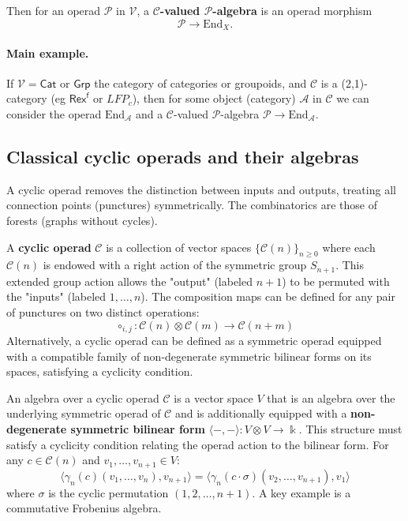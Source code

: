 \documentclass[11pt]{article}
\newcommand{\cat}[1]{\mathcal{#1}}
\newcommand{\field}{\Bbbk}
\newcommand{\C}{\mathcal{C}}
\newcommand{\Rexf}{\mathsf{Rex}^{\mathsf{f}}}
\newcommand{\cA}{\mathcal{A}}
\theoremstyle{definition}
\begin{document}
Then for an operad $\cat{P}$ in $\cat{V}$, a \textbf{$\cat{C}$-valued $\cat{P}$-algebra} is an operad morphism $$\cat{P} \to \text{End}_X.$$


\paragraph{Main example.} If $\cat{V}= \mathsf{Cat}$ or $\mathsf{Grp}$ the category of categories or groupoids, and $\C$ is a (2,1)-category (eg $\Rexf$ or $LFP_c$), then for some object (category) $\cA $ in $\C$ we can consider the operad $\text{End}_\cA$ and a $\C$-valued $\cat{P}$-algebra $\cat{P} \to \text{End}_\cA$.


\subsection{Classical cyclic operads and their algebras}


A cyclic operad removes the distinction between inputs and outputs, treating all connection points (punctures) symmetrically. The combinatorics are those of forests (graphs without cycles).


A \textbf{cyclic operad} $\cat{C}$ is a collection of vector spaces $\{\cat{C}(n)\}_{n \ge 0}$ where each $\cat{C}(n)$ is endowed with a right action of the symmetric group $S_{n+1}$. This extended group action allows the "output" (labeled $n+1$) to be permuted with the "inputs" (labeled $1, \dots, n$). The composition maps can be defined for any pair of punctures on two distinct operations:
\[
    \circ_{i,j} : \cat{C}(n) \otimes \cat{C}(m) \to \cat{C}(n+m)
\]
Alternatively, a cyclic operad can be defined as a symmetric operad equipped with a compatible family of non-degenerate symmetric bilinear forms on its spaces, satisfying a cyclicity condition.




An algebra over a cyclic operad $\cat{C}$ is a vector space $V$ that is an algebra over the underlying symmetric operad of $\cat{C}$ and is additionally equipped with a \textbf{non-degenerate symmetric bilinear form} $\langle-,-\rangle : V \otimes V \to \field$. This structure must satisfy a cyclicity condition relating the operad action to the bilinear form. For any $c \in \cat{C}(n)$ and $v_1, \dots, v_{n+1} \in V$:
\[
    \langle \gamma_n(c)(v_1, \dots, v_n), v_{n+1} \rangle = \langle \gamma_n(c \cdot \sigma)(v_2, \dots, v_{n+1}), v_1 \rangle
\]
where $\sigma$ is the cyclic permutation $(1, 2, \dots, n+1)$. A key example is a commutative Frobenius algebra.
\end{document}
